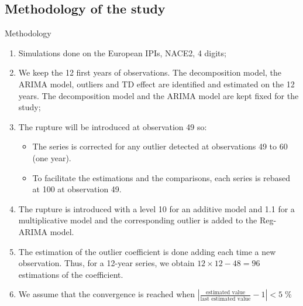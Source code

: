 \documentclass[10pt]{beamer}
\begin{document}
\subsection{Methodology of the study}
\begin{frame}{Methodology}

\begin{enumerate}
	\item Simulations done on the European IPIs, NACE2, 4 digits;
	\item We keep the 12 first years of observations. The decomposition model, the ARIMA model, outliers and TD effect are identified and estimated on the 12 years. The decomposition model and the ARIMA model are kept fixed for the study;
	\item<2-> The rupture will be introduced at observation 49 so:
	\begin{itemize}
	  \item<2-> The series is corrected for any outlier detected at observations 49 to 60 (one year).
	  \item<2-> To facilitate the estimations and the comparisons, each series is rebased at 100 at observation 49.
	\end{itemize}
	\item<3-> The rupture is introduced with a level 10 for an additive model and 1.1 for a multiplicative model  and the corresponding outlier is added to the Reg-ARIMA model.
	\item<3-> The estimation of the outlier coefficient is done adding each time a new observation. Thus, for a 12-year series, we obtain $12 \times 12 - 48 = 96$ estimations of the coefficient.
	\item<4-> We assume that the convergence is reached when $\left\lvert\frac{\text{estimated value}}{\text{last estimated value}}-1\right\rvert < 5\;\%$
\end{enumerate}
\end{frame}
\end{document}
